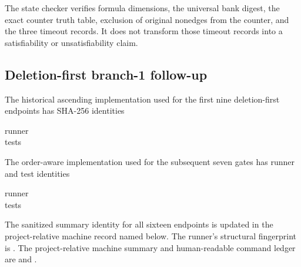 The state checker verifies formula dimensions, the universal bank digest,
the exact counter truth table, exclusion of original nonedges from the
counter, and the three timeout records.  It does not transform those timeout
records into a satisfiability or unsatisfiability claim.

\subsection{Deletion-first branch-1 follow-up}

The historical ascending implementation used for the first nine
deletion-first endpoints has SHA-256 identities
\begin{description}
\item[runner]
\item[tests]
\end{description}
The order-aware implementation used for the subsequent seven gates has
runner and test identities
\begin{description}
\item[runner]
\item[tests]
\end{description}
The sanitized summary identity for all sixteen endpoints is updated in the
project-relative machine record named below.
The runner's structural fingerprint is
\linebreak
{}.
The project-relative machine summary and human-readable command ledger are
 and
.

